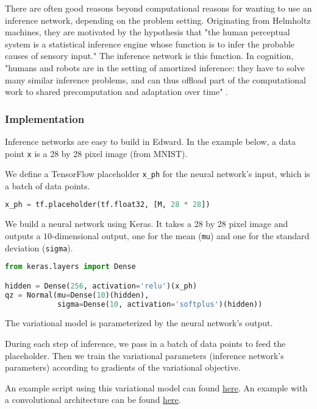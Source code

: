 There are often good reasons beyond computational reasons
for wanting to use an inference network, depending on the problem
setting.
Originating from
Helmholtz machines, they are motivated by the hypothesis
that "the human perceptual system is a statistical inference engine
whose function is to infer the probable causes of sensory input." The
inference network is this function.
In cognition, "humans and robots are in the setting of amortized
inference: they have to solve many similar inference problems, and can
thus offload part of the computational work to shared precomputation
and adaptation over time" \citep{stuhlmuller2013learning}.

\subsubsection{Implementation}

Inference networks are easy to build in Edward.
In the example below, a data point \texttt{x} is a 28 by 28 pixel
image (from MNIST).

We define a TensorFlow placeholder \texttt{x_ph} for the neural
network's input, which is a batch of data points.
\begin{lstlisting}[language=Python]
x_ph = tf.placeholder(tf.float32, [M, 28 * 28])
\end{lstlisting}

We build a neural network using Keras.
It takes a 28 by 28 pixel image and outputs a $10$-dimensional
output, one for the mean (\texttt{mu}) and one for the standard
deviation (\texttt{sigma}).
\begin{lstlisting}[language=Python]
from keras.layers import Dense

hidden = Dense(256, activation='relu')(x_ph)
qz = Normal(mu=Dense(10)(hidden),
            sigma=Dense(10, activation='softplus')(hidden))
\end{lstlisting}
The variational model is parameterized by the neural network's
output.

During each step of inference, we pass in a batch of data points to feed the
placeholder. Then we train the variational parameters (inference
network's parameters) according to
gradients of the variational objective.

An example script using this variational model can found
\href{https://github.com/blei-lab/edward/blob/master/examples/vae.py}
{here}.
An example with a convolutional architecture can be found
\href{https://github.com/blei-lab/edward/blob/master/examples/vae_convolutional_prettytensor.py}
{here}.

